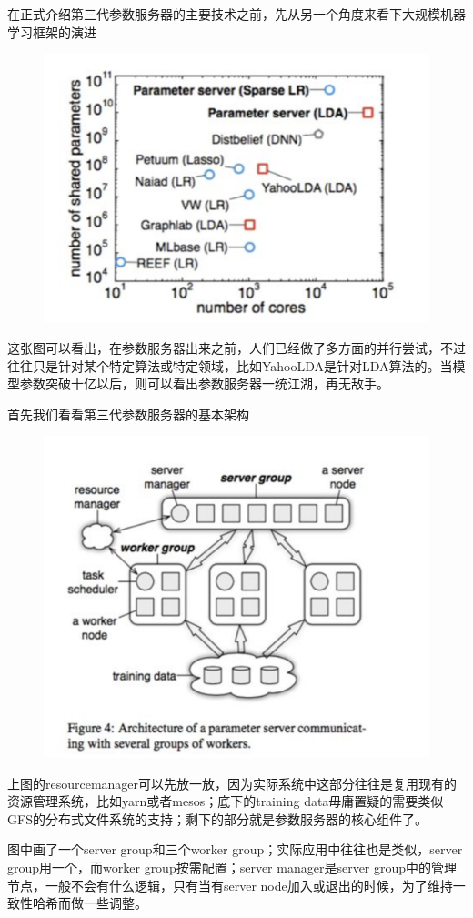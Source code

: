 \documentclass[12pt]{article}
\begin{document}
在正式介绍第三代参数服务器的主要技术之前，先从另一个角度来看下大规模机器学习框架的演进
\begin{figure}[H]
    \centering
    \includegraphics[width=.6\textwidth]{fig/Large_Scale_Framework_Evolution.png}
\end{figure}
这张图可以看出，在参数服务器出来之前，人们已经做了多方面的并行尝试，不过往往只是针对某个特定算法或特定领域，比如YahooLDA是针对LDA算法的。当模型参数突破十亿以后，则可以看出参数服务器一统江湖，再无敌手。

首先我们看看第三代参数服务器的基本架构
\begin{figure}[H]
    \centering
    \includegraphics[width=.6\textwidth]{fig/Large_Scale_Parameter_Server_Epoch_3.png}
\end{figure}

上图的resourcemanager可以先放一放，因为实际系统中这部分往往是复用现有的资源管理系统，比如yarn或者mesos；底下的training data毋庸置疑的需要类似GFS的分布式文件系统的支持；剩下的部分就是参数服务器的核心组件了。

图中画了一个server group和三个worker group；实际应用中往往也是类似，server group用一个，而worker group按需配置；server manager是server group中的管理节点，一般不会有什么逻辑，只有当有server node加入或退出的时候，为了维持一致性哈希而做一些调整。
\end{document}
